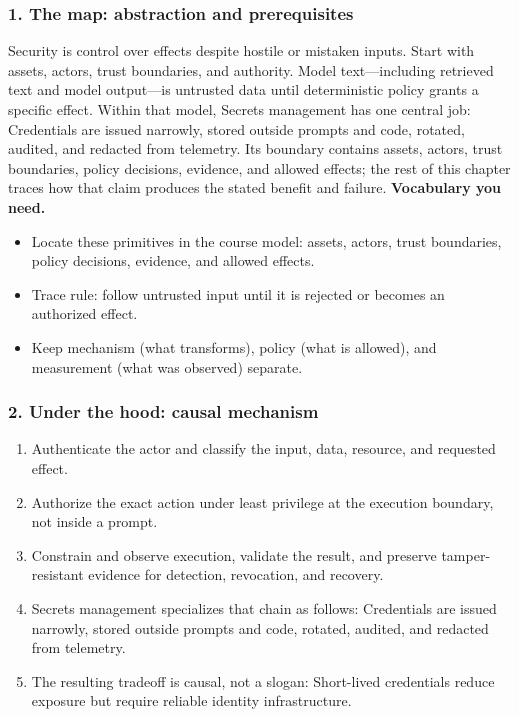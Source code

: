 \subsubsection*{1. The map: abstraction and prerequisites}
Security is control over effects despite hostile or mistaken inputs. Start with assets, actors, trust boundaries, and authority. Model text—including retrieved text and model output—is untrusted data until deterministic policy grants a specific effect.
Within that model, Secrets management has one central job: Credentials are issued narrowly, stored outside prompts and code, rotated, audited, and redacted from telemetry. Its boundary contains assets, actors, trust boundaries, policy decisions, evidence, and allowed effects; the rest of this chapter traces how that claim produces the stated benefit and failure.
\textbf{Vocabulary you need.}\begin{itemize}
\item Locate these primitives in the course model: assets, actors, trust boundaries, policy decisions, evidence, and allowed effects.
\item Trace rule: follow untrusted input until it is rejected or becomes an authorized effect.
\item Keep mechanism (what transforms), policy (what is allowed), and measurement (what was observed) separate.
\end{itemize}
\subsubsection*{2. Under the hood: causal mechanism}\begin{enumerate}
\item Authenticate the actor and classify the input, data, resource, and requested effect.
\item Authorize the exact action under least privilege at the execution boundary, not inside a prompt.
\item Constrain and observe execution, validate the result, and preserve tamper-resistant evidence for detection, revocation, and recovery.
\item Secrets management specializes that chain as follows: Credentials are issued narrowly, stored outside prompts and code, rotated, audited, and redacted from telemetry.
\item The resulting tradeoff is causal, not a slogan: Short-lived credentials reduce exposure but require reliable identity infrastructure.
\end{enumerate}
